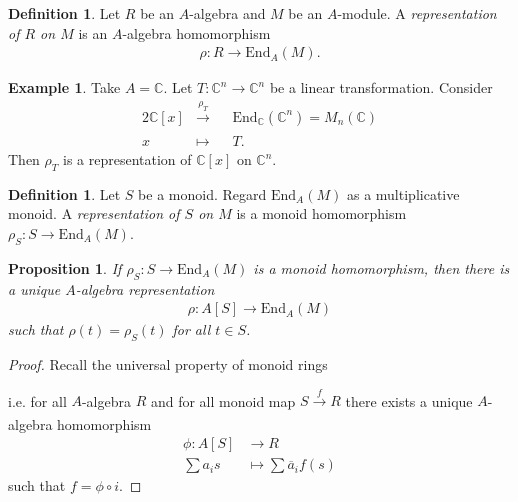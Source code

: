 \documentclass[12pt]{report}
\theoremstyle{plain}
\newtheorem{proposition}[theorem]{Proposition}
\theoremstyle{remark}
\theoremstyle{definition}
\newtheorem{definition}[theorem]{Definition}
\newtheorem{example}[theorem]{Example}
\newcommand{\C}{\mathbb{C}}
\begin{document}
\begin{definition}
    Let $R$ be an $A$-algebra and $M$ be an $A$-module. A \emph{representation of $R$ on $M$} is an $A$-algebra homomorphism
    \begin{align*}
        \rho:R\rightarrow \mathrm{End}_A(M).
    \end{align*}
\end{definition}

\begin{example}
    Take $A=\C$. Let $T:\C^n\rightarrow \C^n$ be a linear transformation. Consider
    \begin{alignat*}{2}
        \C[x] &\xrightarrow[]{\rho_T} &&\mathrm{End}_\C(\C^n)=M_n(\C) \\
        x &\mapsto &&T.
    \end{alignat*}
    Then $\rho_T$ is a representation of $\C[x]$ on $\C^n$.
\end{example}

\begin{definition}
    Let $S$ be a monoid. Regard $\mathrm{End}_A(M)$ as a multiplicative monoid. A \emph{representation of $S$ on $M$} is a monoid homomorphism $\rho_S:S\rightarrow\mathrm{End}_A(M)$.
\end{definition}

\begin{proposition}
    If $\rho_S:S\rightarrow\mathrm{End}_A(M)$ is a monoid homomorphism, then there is a unique $A$-algebra representation
    \begin{align*}
        \rho:A[S]\rightarrow \mathrm{End}_A(M)
    \end{align*}
    such that $\rho(t)=\rho_S(t)$ for all $t\in S$.
\end{proposition}
\begin{proof}
    Recall the universal property of monoid rings
    \begin{figure}[H]
        \centering
    \end{figure}
    \noindent i.e. for all $A$-algebra $R$ and for all monoid map $S\xrightarrow[]{f}R$ there exists a unique $A$-algebra homomorphism 
    \begin{align*}
        \phi:A[S] &\rightarrow R \\
        \sum a_i s &\mapsto \sum \overline{a}_i f(s)
    \end{align*}
    such that $f=\phi\circ i$.
\end{proof}
\end{document}
